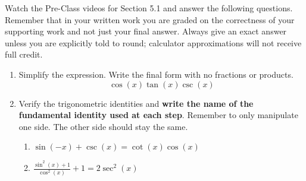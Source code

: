 


\noindent Watch the Pre-Class videos for Section 5.1 and answer the following questions. Remember that in your written work you are graded on the correctness of your supporting work and not just your final answer. Always give an exact answer unless you are explicitly told to round; calculator approximations will not receive full credit. 


\begin{enumerate}
\item  Simplify the expression.  Write the final form with no fractions or products.
$$\cos(x)\tan(x)\csc(x)$$

\vfill

\item Verify the trigonometric identities and \textbf{write the name of the fundamental identity used at each step}. Remember to only manipulate one side.  The other side should stay the same.

\begin{enumerate}
\item  $\sin(-x)+\csc(x)=\cot(x)\cos(x)$\vfill
\vfill
\vfill


\newpage
\item  $\displaystyle \frac{\sin^2(x)+1}{\cos^2(x)}+1=2\sec^2(x)$\vfill
\end{enumerate}

\end{enumerate}


